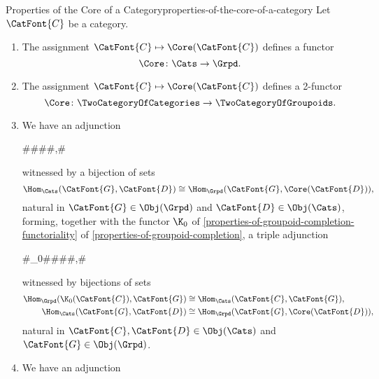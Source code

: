\begin{proposition}{Properties of the Core of a Category}{properties-of-the-core-of-a-category}%
    Let $\CatFont{C}$ be a category.
    \begin{enumerate}
        \item\label{properties-of-the-core-of-a-category-functoriality}The assignment $\CatFont{C}\mapsto\Core(\CatFont{C})$ defines a functor
            \[
                \Core
                \colon
                \Cats
                \to
                \Grpd.
            \]%
        \item\label{properties-of-the-core-of-a-category-2-functoriality}The assignment $\CatFont{C}\mapsto\Core(\CatFont{C})$ defines a 2-functor
            \[
                \Core
                \colon
                \TwoCategoryOfCategories%
                \to
                \TwoCategoryOfGroupoids.%
            \]%
        \item\label{properties-of-the-core-of-a-category-adjointness}We have an adjunction
            \begin{webcompile}
                \varHookAdjunction#\iota#\Core#\Grpd#\Cats,#
            \end{webcompile}%
            witnessed by a bijection of sets
            \[
                \Hom_{\Cats}(\CatFont{G},\CatFont{D})%
                \cong
                \Hom_{\Grpd}(\CatFont{G},\Core(\CatFont{D})),%
            \]%
            natural in $\CatFont{G}\in\Obj(\Grpd)$ and $\CatFont{D}\in\Obj(\Cats)$, forming, together with the functor $\K_{0}$ of \cref{properties-of-groupoid-completion-functoriality} of \cref{properties-of-groupoid-completion}, a triple adjunction
            \begin{webcompile}
                \HookTripleAdjunction#\K_{0}#\iota#\Core#\Cats#\Grpd,#
            \end{webcompile}%
            witnessed by bijections of sets
            \begin{align*}
                \Hom_{\Grpd}(\K_{0}(\CatFont{C}),\CatFont{G}) &\cong \Hom_{\Cats}(\CatFont{C},\CatFont{G}),\\%
                \Hom_{\Cats}(\CatFont{G},\CatFont{D})         &\cong \Hom_{\Grpd}(\CatFont{G},\Core(\CatFont{D})),%
            \end{align*}
            natural in $\CatFont{C},\CatFont{D}\in\Obj(\Cats)$ and $\CatFont{G}\in\Obj(\Grpd)$.
        \item\label{properties-of-the-core-of-a-category-2-adjointness}We have an adjunction

\end{enumerate}
\end{proposition}
